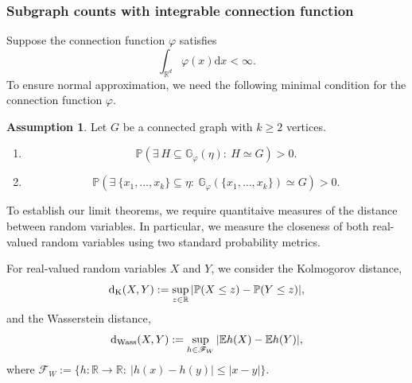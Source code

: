 \documentclass{article}
\theoremstyle{definition}
\newtheorem{ass}[theorem]{Assumption}
\numberwithin{equation}{section}
\theoremstyle{remark}
\begin{document}
\subsubsection{Subgraph counts with integrable connection function}
Suppose the connection function $\varphi$ satisfies 
$$
\int_{\mathbb{R}^d}\varphi(x)\mathrm{d}x<\infty.
$$
To ensure normal approximation, we need the following minimal condition for the connection function $\varphi$.
\begin{ass}\label{graph-ass1}
	Let $G$ be a connected graph with $k\ge2$ vertices.
\begin{enumerate}
	\item[i)] 
\begin{equation}
	\mathbb{P}(\exists\ H\subseteq \mathbb{G}_{\varphi}(\eta):\ H\simeq G)>0.
\end{equation}
\item[ii)]
\begin{equation}
	\mathbb{P}\left(\exists\ \{x_1,\dots,x_k\}\subseteq\eta:\ \mathbb{G}_{\varphi}(\{x_1,\dots,x_k\})\simeq G\right)>0.
\end{equation}
\end{enumerate}
\end{ass}

To establish our limit theorems, we require quantitaive measures of the distance between random variables. In particular, we measure the closeness of both real-valued random variables using two standard probability metrics.

For real-valued random variables $X$ and $Y$, we consider the Kolmogorov distance,
\begin{equation*}
	\mathrm{d}_{\rm K}(X,Y):=\sup_{z\in\mathbb{R}}|\mathbb{P}(X\le z)-\mathbb{P}(Y\le z)|,
\end{equation*}
and the Wasserstein distance,
\begin{equation*}
	\mathrm{d}_{\rm Wass}(X,Y):=\sup_{h\in\mathscr{F}_W}|\mathbb{E} h(X)-\mathbb{E} h(Y)|,
\end{equation*}
where $\mathscr{F}_W:=\{h:\mathbb{R}\to\mathbb{R}:~|h(x)-h(y)|\le |x-y|\}$.
\end{document}
